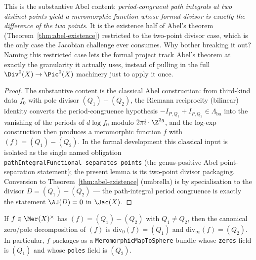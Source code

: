 \begin{layman}
This is the substantive Abel content: \emph{period-congruent path
integrals at two distinct points yield a meromorphic function whose
formal divisor is exactly the difference of the two points.} It is
the existence half of Abel's theorem (Theorem~\ref{thm:abel-existence})
restricted to the two-point divisor case, which is the only case the
Jacobian challenge ever consumes. Why bother breaking it out? Naming
this restricted case lets the formal project track Abel's theorem at
exactly the granularity it actually uses, instead of pulling in the
full \(\Div^0(X) \to \Pic^0(X)\) machinery just to apply it once.

\end{layman}

\begin{proof}
The substantive content is the classical Abel construction: from
third-kind data \(f_0\) with pole divisor \((Q_1)+(Q_2)\), the
Riemann reciprocity (bilinear) identity converts the period-congruence
hypothesis \(-I_{P,Q_1}+I_{P,Q_2}\in\Lambda_{\mathrm{ba}}\) into the
vanishing of the periods of \(d\log f_0\) modulo \(2\pi i\cdot\Z^{2g}\),
and the log-exp construction then produces a meromorphic function
\(f\) with \((f) = (Q_1) - (Q_2)\). In the formal development this
classical input is isolated as the single named obligation
\texttt{pathIntegralFunctional\_separates\_points} (the genus-positive
Abel point-separation statement); the present lemma is its two-point
divisor packaging. Conversion to Theorem~\ref{thm:abel-existence}
(umbrella) is by specialisation to the divisor \(D = (Q_1) - (Q_2)\)
--- the path-integral period congruence is exactly the statement
\(\AJ(D) = 0\) in \(\Jac(X)\).
\end{proof}

\begin{lemma}
\label{lem:two-point-principal-packaging}

If \(f\in\Mer(X)^\times\) has \((f) = (Q_1) - (Q_2)\) with
\(Q_1\neq Q_2\), then the canonical zero/pole decomposition of
\((f)\) is \(\mathrm{div}_0(f) = (Q_1)\) and
\(\mathrm{div}_\infty(f) = (Q_2)\). In particular, \(f\) packages as
a \texttt{MeromorphicMapToSphere} bundle whose \texttt{zeros} field
is \((Q_1)\) and whose \texttt{poles} field is \((Q_2)\).
\leanok
\end{lemma}

